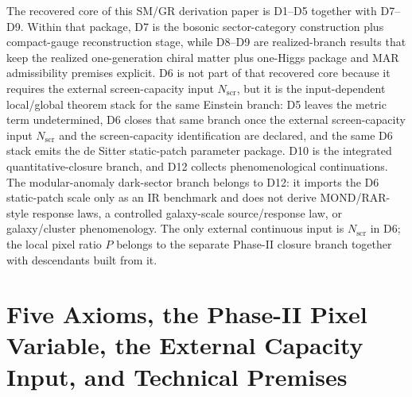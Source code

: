 \documentclass[11pt]{article}
\begin{document}
The recovered core of this SM/GR derivation paper is D1--D5 together with D7--D9. Within that package, D7 is the bosonic sector-category construction plus compact-gauge reconstruction stage, while D8--D9 are realized-branch results that keep the realized one-generation chiral matter plus one-Higgs package and MAR admissibility premises explicit. D6 is not part of that recovered core because it requires the external screen-capacity input \(N_{\mathrm{scr}}\), but it is the input-dependent local/global theorem stack for the same Einstein branch: D5 leaves the metric term undetermined, D6 closes that same branch once the external screen-capacity input \(N_{\mathrm{scr}}\) and the screen-capacity identification are declared, and the same D6 stack emits the de Sitter static-patch parameter package. D10 is the integrated quantitative-closure branch, and D12 collects phenomenological continuations. The modular-anomaly dark-sector branch belongs to D12: it imports the D6 static-patch scale only as an IR benchmark and does not derive MOND/RAR-style response laws, a controlled galaxy-scale source/response law, or galaxy/cluster phenomenology. The only external continuous input is \(N_{\mathrm{scr}}\) in D6; the local pixel ratio \(P\) belongs to the separate Phase-II closure branch together with descendants built from it.
\section{Five Axioms, the Phase-II Pixel Variable, the External Capacity Input, and Technical Premises}\label{sec:premise-ledger}
\end{document}
